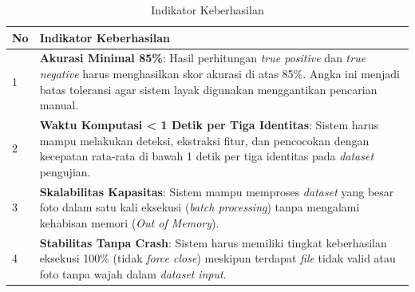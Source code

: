 \begin{table}[h]
	\caption{Indikator Keberhasilan}
\label{tab:indikator keberhasilan}
\begin{tabular}{ | p{1cm} | p{12cm} | }
    \hline
    \textbf{No} & \textbf{Indikator Keberhasilan} \\ \hline

    1 & \textbf{Akurasi Minimal 85\%}: 
    Hasil perhitungan \textit{true positive} dan \textit{true negative} harus menghasilkan skor akurasi di atas 85\%. 
    Angka ini menjadi batas toleransi agar sistem layak digunakan menggantikan pencarian manual. \\ \hline

    2 & \textbf{Waktu Komputasi < 1 Detik per Tiga Identitas}:
    Sistem harus mampu melakukan deteksi, ekstraksi fitur, dan pencocokan dengan kecepatan rata-rata di bawah 1 detik per tiga identitas pada \textit{dataset} pengujian. \\ \hline

    3 & \textbf{Skalabilitas Kapasitas}:
    Sistem mampu memproses \textit{dataset} yang besar foto dalam satu kali eksekusi (\textit{batch processing}) tanpa mengalami kehabisan memori (\textit{Out of Memory}). \\ \hline

    4 & \textbf{Stabilitas Tanpa Crash}:
    Sistem harus memiliki tingkat keberhasilan eksekusi 100\% (tidak \textit{force close}) meskipun terdapat \textit{file} tidak valid atau foto tanpa wajah dalam \textit{dataset} \textit{input}. \\ \hline

\end{tabular}
\end{table}